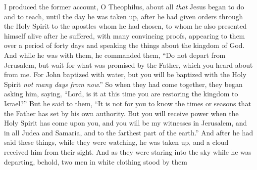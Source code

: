 
\begin{biblechapter} %
 I produced the former account, O Theophilus, about all \textit{that} Jesus began to do and to teach,
\verse until the day he was taken up, after he had given orders through the Holy Spirit to the apostles whom he had chosen,
\verse to whom he also presented himself alive after he suffered, with many convincing proofs, appearing to them over a period of forty days and speaking the things about the kingdom of God.
\verse And while he was with them, he commanded them, “Do not depart from Jerusalem, but wait for what was promised by the Father, which you heard about from me.
\verse For John baptized with water, but you will be baptized with the Holy Spirit \textit{not many days from now}.”
 So when they had come together, they began asking him, saying, “Lord, is it at this time you are restoring the kingdom to Israel?”
\verse But he said to them, “It is not for you to know the times or seasons that the Father has set by his own authority.
\verse But you will receive power when the Holy Spirit has come upon you, and you will be my witnesses in Jerusalem, and in all Judea and Samaria, and to the farthest part of the earth.”
\verse And after he had said these things, while they were watching, he was taken up, and a cloud received him from their sight.
\verse And as they were staring into the sky while he was departing, behold, two men in white clothing stood by them

\end{biblechapter}
